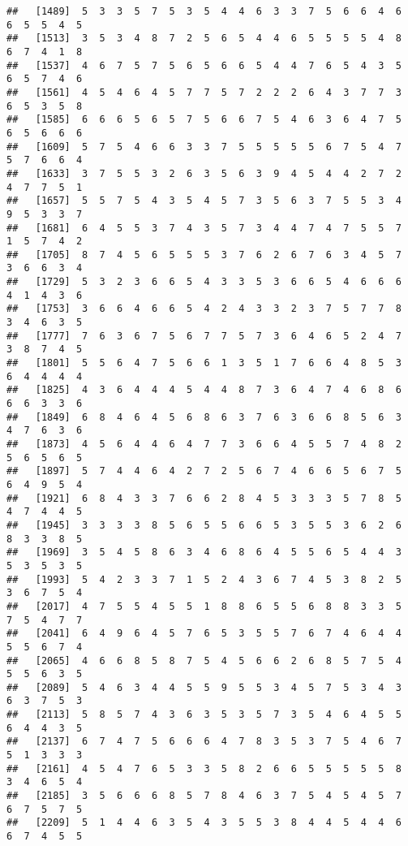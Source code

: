 \documentclass[
]{book}
\begin{document}
\begin{verbatim}
##   [1489]  5  3  3  5  7  5  3  5  4  4  6  3  3  7  5  6  6  4  6  6  5  5  4  5
##   [1513]  3  5  3  4  8  7  2  5  6  5  4  4  6  5  5  5  5  4  8  6  7  4  1  8
##   [1537]  4  6  7  5  7  5  6  5  6  6  5  4  4  7  6  5  4  3  5  6  5  7  4  6
##   [1561]  4  5  4  6  4  5  7  7  5  7  2  2  2  6  4  3  7  7  3  6  5  3  5  8
##   [1585]  6  6  6  5  6  5  7  5  6  6  7  5  4  6  3  6  4  7  5  6  5  6  6  6
##   [1609]  5  7  5  4  6  6  3  3  7  5  5  5  5  5  6  7  5  4  7  5  7  6  6  4
##   [1633]  3  7  5  5  3  2  6  3  5  6  3  9  4  5  4  4  2  7  2  4  7  7  5  1
##   [1657]  5  5  7  5  4  3  5  4  5  7  3  5  6  3  7  5  5  3  4  9  5  3  3  7
##   [1681]  6  4  5  5  3  7  4  3  5  7  3  4  4  7  4  7  5  5  7  1  5  7  4  2
##   [1705]  8  7  4  5  6  5  5  5  3  7  6  2  6  7  6  3  4  5  7  3  6  6  3  4
##   [1729]  5  3  2  3  6  6  5  4  3  3  5  3  6  6  5  4  6  6  6  4  1  4  3  6
##   [1753]  3  6  6  4  6  6  5  4  2  4  3  3  2  3  7  5  7  7  8  3  4  6  3  5
##   [1777]  7  6  3  6  7  5  6  7  7  5  7  3  6  4  6  5  2  4  7  3  8  7  4  5
##   [1801]  5  5  6  4  7  5  6  6  1  3  5  1  7  6  6  4  8  5  3  6  4  4  4  4
##   [1825]  4  3  6  4  4  4  5  4  4  8  7  3  6  4  7  4  6  8  6  6  6  3  3  6
##   [1849]  6  8  4  6  4  5  6  8  6  3  7  6  3  6  6  8  5  6  3  4  7  6  3  6
##   [1873]  4  5  6  4  4  6  4  7  7  3  6  6  4  5  5  7  4  8  2  5  6  5  6  5
##   [1897]  5  7  4  4  6  4  2  7  2  5  6  7  4  6  6  5  6  7  5  6  4  9  5  4
##   [1921]  6  8  4  3  3  7  6  6  2  8  4  5  3  3  3  5  7  8  5  4  7  4  4  5
##   [1945]  3  3  3  3  8  5  6  5  5  6  6  5  3  5  5  3  6  2  6  8  3  3  8  5
##   [1969]  3  5  4  5  8  6  3  4  6  8  6  4  5  5  6  5  4  4  3  5  3  5  3  5
##   [1993]  5  4  2  3  3  7  1  5  2  4  3  6  7  4  5  3  8  2  5  3  6  7  5  4
##   [2017]  4  7  5  5  4  5  5  1  8  8  6  5  5  6  8  8  3  3  5  7  5  4  7  7
##   [2041]  6  4  9  6  4  5  7  6  5  3  5  5  7  6  7  4  6  4  4  5  5  6  7  4
##   [2065]  4  6  6  8  5  8  7  5  4  5  6  6  2  6  8  5  7  5  4  5  5  6  3  5
##   [2089]  5  4  6  3  4  4  5  5  9  5  5  3  4  5  7  5  3  4  3  6  3  7  5  3
##   [2113]  5  8  5  7  4  3  6  3  5  3  5  7  3  5  4  6  4  5  5  6  4  4  3  5
##   [2137]  6  7  4  7  5  6  6  6  4  7  8  3  5  3  7  5  4  6  7  5  1  3  3  3
##   [2161]  4  5  4  7  6  5  3  3  5  8  2  6  6  5  5  5  5  5  8  3  4  6  5  4
##   [2185]  3  5  6  6  6  8  5  7  8  4  6  3  7  5  4  5  4  5  7  6  7  5  7  5
##   [2209]  5  1  4  4  6  3  5  4  3  5  5  3  8  4  4  5  4  4  6  6  7  4  5  5

\end{verbatim}
\end{document}
